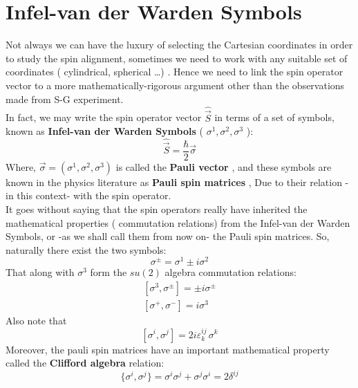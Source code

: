 \section{Infel-van der Warden Symbols}
Not always we can have the luxury of selecting the Cartesian coordinates in order to study the spin alignment, sometimes we need to work with any suitable set of coordinates ( cylindrical, spherical \dots ) . Hence we need to link the spin operator vector to a more mathematically-rigorous argument other than the observations made from S-G experiment.\\
In fact, we may write the spin operator vector $\hat{\vec S}$ in terms of a set of symbols, known as  \textbf{Infel-van der Warden Symbols}  ( $ \sigma ^1, \sigma^2, \sigma^3$ ):
\begin{equation}
\hat{\vec S} = \frac{\hbar}{2} \vec \sigma
\end{equation}
Where, $ \vec \sigma = ( \sigma ^1, \sigma^2, \sigma^3 )$ is called the \textbf{Pauli vector }, and these symbols are known in the physics literature as \textbf{Pauli spin matrices }, Due to their relation - in this context- with the spin operator. \\
It goes without saying that the spin operators really have inherited the mathematical properties ( commutation relations) from the Infel-van der Warden Symbols, or -as we shall call them from now on- the Pauli spin matrices. So, naturally there exist the two symbols:
\begin{equation}
\sigma ^{\pm} = \sigma^1 \pm i \sigma ^2
\end{equation}
That along with $ \sigma^3$ form the $su(2)$ algebra commutation relations:
\begin{equation}
\begin{matrix}
[\sigma^3,\sigma^{\pm}] = \pm i \sigma^\pm \\
[ \sigma^+, \sigma ^-] = i \sigma^3
\end{matrix}
\end{equation}
Also note that $$ [\sigma^i, \sigma^j] = 2 i \varepsilon^{ij}_k\,\sigma^k $$ 
Moreover, the pauli spin matrices have an important mathematical property called the \textbf{Clifford algebra }relation:
\begin{equation}
\{\sigma^i, \sigma^j\} = \sigma^i \sigma^j + \sigma^j\sigma^i = 2 \delta ^{ij}
\end{equation}
